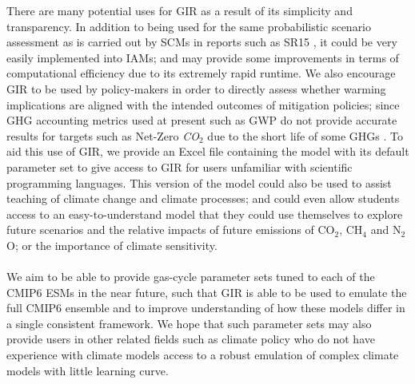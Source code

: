 \documentclass[gmd, manuscript]{copernicus}
\begin{document}
There are many potential uses for GIR as a result of its simplicity and transparency. In addition to being used for the same probabilistic scenario assessment as is carried out by SCMs in reports such as SR15 \citep{IPCC2018}, it could be very easily implemented into IAMs; and may provide some improvements in terms of computational efficiency due to its extremely rapid runtime. We also encourage GIR to be used by policy-makers in order to directly assess whether warming implications are aligned with the intended outcomes of mitigation policies; since GHG accounting metrics used at present such as GWP do not provide accurate results for targets such as Net-Zero \emph{CO$_2$} due to the short life of some GHGs \citep{Allen2018a}. To aid this use of GIR, we provide an Excel file containing the model with its default parameter set to give access to GIR for users unfamiliar with scientific programming languages. This version of the model could also be used to assist teaching of climate change and climate processes; and could even allow students access to an easy-to-understand model that they could use themselves to explore future scenarios and the relative impacts of future emissions of CO$_2$, CH$_4$ and N$_2$O; or the importance of climate sensitivity.\\\\
We aim to be able to provide gas-cycle parameter sets tuned to each of the CMIP6 ESMs in the near future, such that GIR is able to be used to emulate the full CMIP6 ensemble and to improve understanding of how these models differ in a single consistent framework. We hope that such parameter sets may also provide users in other related fields such as climate policy who do not have experience with climate models access to a robust emulation of complex climate models with little learning curve.







\end{document}
